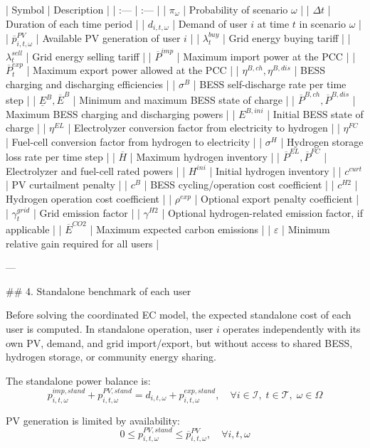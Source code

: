 | Symbol | Description |
| :--- | :--- |
| $\pi_{\omega}$ | Probability of scenario $\omega$ |
| $\Delta t$ | Duration of each time period |
| $d_{i,t,\omega}$ | Demand of user $i$ at time $t$ in scenario $\omega$ |
| $\overline{p}^{PV}_{i,t,\omega}$ | Available PV generation of user $i$ |
| $\lambda^{buy}_{t}$ | Grid energy buying tariff |
| $\lambda^{sell}_{t}$ | Grid energy selling tariff |
| $\overline{P}^{imp}$ | Maximum import power at the PCC |
| $\overline{P}^{exp}_{t}$ | Maximum export power allowed at the PCC |
| $\eta^{B,ch}, \eta^{B,dis}$ | BESS charging and discharging efficiencies |
| $\sigma^{B}$ | BESS self-discharge rate per time step |
| $\underline{E}^{B}, \overline{E}^{B}$ | Minimum and maximum BESS state of charge |
| $\overline{P}^{B,ch}, \overline{P}^{B,dis}$ | Maximum BESS charging and discharging powers |
| $E^{B,ini}$ | Initial BESS state of charge |
| $\eta^{EL}$ | Electrolyzer conversion factor from electricity to hydrogen |
| $\eta^{FC}$ | Fuel-cell conversion factor from hydrogen to electricity |
| $\sigma^{H}$ | Hydrogen storage loss rate per time step |
| $\overline{H}$ | Maximum hydrogen inventory |
| $\overline{P}^{EL}, \overline{P}^{FC}$ | Electrolyzer and fuel-cell rated powers |
| $H^{ini}$ | Initial hydrogen inventory |
| $c^{curt}$ | PV curtailment penalty |
| $c^{B}$ | BESS cycling/operation cost coefficient |
| $c^{H2}$ | Hydrogen operation cost coefficient |
| $\rho^{exp}$ | Optional export penalty coefficient |
| $\gamma^{grid}_{t}$ | Grid emission factor |
| $\gamma^{H2}$ | Optional hydrogen-related emission factor, if applicable |
| $\overline{E}^{CO2}$ | Maximum expected carbon emissions |
| $\varepsilon$ | Minimum relative gain required for all users |

---

## 4. Standalone benchmark of each user

Before solving the coordinated EC model, the expected standalone cost of each user is computed. In standalone operation, user $i$ operates independently with its own PV, demand, and grid import/export, but without access to shared BESS, hydrogen storage, or community energy sharing.

The standalone power balance is:
$$ p^{imp,stand}_{i,t,\omega}+p^{PV,stand}_{i,t,\omega} =d_{i,t,\omega}+p^{exp,stand}_{i,t,\omega}, \quad \forall i\in\mathcal{I},\; t\in\mathcal{T},\; \omega\in\Omega $$

PV generation is limited by availability:
$$ 0\le p^{PV,stand}_{i,t,\omega}\le \overline{p}^{PV}_{i,t,\omega}, \quad \forall i,t,\omega $$

